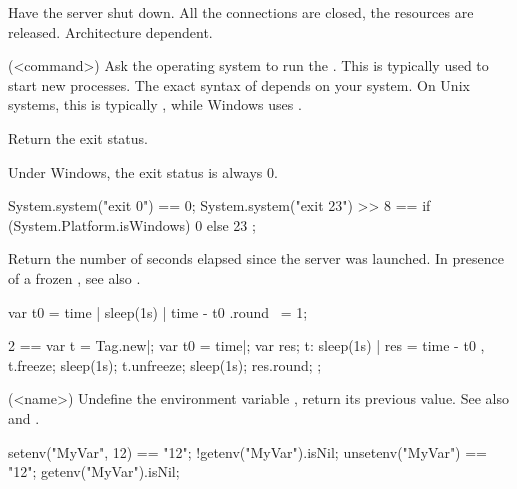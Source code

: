 \begin{urbiscriptapi}
\item[shutdown] Have the \urbi server shut down.  All the connections
  are closed, the resources are released.  Architecture dependent.

\item[system](<command>)%
  Ask the operating system to run the .  This is
  typically used to start new processes.  The exact syntax of
   depends on your system.  On Unix systems, this is
  typically , while Windows uses .

  Return the exit status.

  \begin{windows}
    Under Windows, the exit status is always 0.
  \end{windows}

\begin{urbiassert}
System.system("exit 0") == 0;
System.system("exit 23") >> 8
       == { if (System.Platform.isWindows) 0 else 23 };
\end{urbiassert}


\item[time] Return the number of seconds elapsed since the \urbi
  server was launched.  In presence of a frozen , see
  also .
\begin{urbiassert}
{ var t0 = time | sleep(1s) | time - t0 }.round ~= 1;

  2 ==
  {
    var t = Tag.new|;
    var t0 = time|;
    var res;
    t: { sleep(1s) | res = time - t0 },
    t.freeze;
    sleep(1s);
    t.unfreeze;
    sleep(1s);
    res.round;
  };
\end{urbiassert}

\item[unsetenv](<name>)%
  Undefine the environment variable , return its previous value.
  See also  and .

\begin{urbiassert}
setenv("MyVar", 12) == "12";
!getenv("MyVar").isNil;
unsetenv("MyVar") == "12";
getenv("MyVar").isNil;
\end{urbiassert}


\end{urbiscriptapi}

